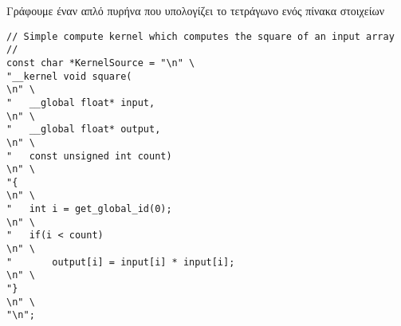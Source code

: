 Γράφουμε έναν απλό πυρήνα που υπολογίζει το τετράγωνο ενός πίνακα στοιχείων
\begin{lstlisting}[basicstyle=\scriptsize]
// Simple compute kernel which computes the square of an input array 
//
const char *KernelSource = "\n" \
"__kernel void square(                                                       \n" \
"   __global float* input,                                              \n" \
"   __global float* output,                                             \n" \
"   const unsigned int count)                                           \n" \
"{                                                                      \n" \
"   int i = get_global_id(0);                                           \n" \
"   if(i < count)                                                       \n" \
"       output[i] = input[i] * input[i];                                \n" \
"}                                                                      \n" \
"\n";
\end{lstlisting}
 
